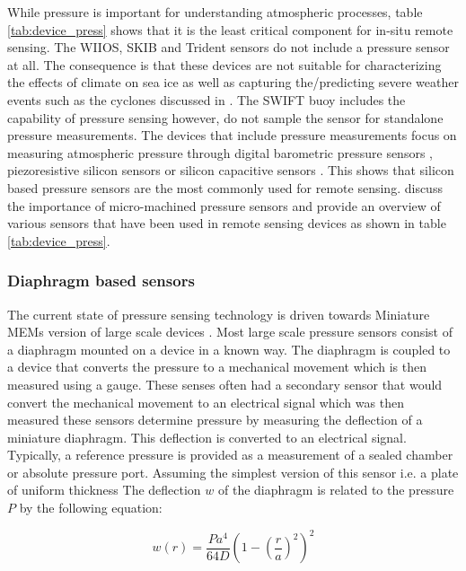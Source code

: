 While pressure is important for understanding atmospheric processes, table \ref{tab:device_press} shows that it is the least critical component for in-situ remote sensing. The WIIOS, SKIB and Trident sensors do not include a pressure sensor at all. The consequence is that these devices are not suitable for characterizing the effects of climate on sea ice as well as capturing the/predicting severe weather events such as the cyclones discussed in \textcite{vichi2019effects}. The SWIFT buoy includes the capability of pressure sensing however, do not sample the sensor for standalone pressure measurements. The devices that include pressure measurements focus on measuring atmospheric pressure through digital barometric pressure sensors \cite{rabault2019open,planck2019evolution}, piezoresistive silicon sensors \cite{doble2017robust} or silicon capacitive sensors \cite{uptempo}. This shows that silicon based pressure sensors are the most commonly used for remote sensing.\textcite{eaton1997micromachined} discuss the importance of micro-machined pressure sensors and provide an overview of various sensors that have been used in remote sensing devices as shown in table \ref{tab:device_press}.
\subsubsection{Diaphragm based sensors}

The current state of pressure sensing technology is driven towards Miniature MEMs version of large scale devices \cite{eaton1997micromachined}. Most large scale pressure sensors consist of a diaphragm mounted on a device in a known way. The diaphragm is coupled to a device that converts the pressure to a mechanical movement which is then measured using a gauge. These senses often had a secondary sensor that would convert the mechanical movement to an electrical signal which was then measured \cite{eaton1997micromachined} these sensors determine pressure by measuring the deflection of a miniature diaphragm. This deflection is converted to an electrical signal. Typically, a reference pressure is provided as a measurement of a sealed chamber or absolute pressure port. Assuming the simplest version of this sensor i.e. a plate of uniform thickness \cite{eaton1997micromachined} The deflection $w$ of the diaphragm is related to the pressure  $P$ by the following equation: \cite{eaton1997micromachined}

\begin{equation}
	w(r) = \frac{Pa^4}{64D}(1- (\frac{r}{a})^2)^2
\end{equation}


